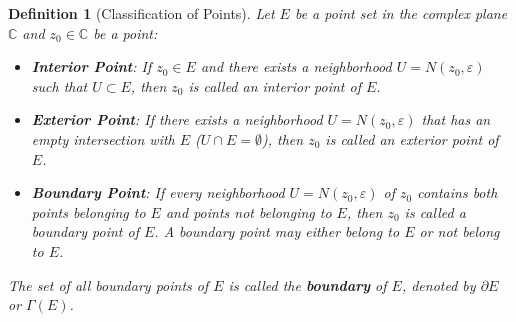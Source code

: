 \documentclass[11pt,a4paper]{article}
\theoremstyle{definitionbreak}
\newtheorem{definition}{Definition}
\theoremstyle{examplebreak}
\theoremstyle{plain}
\begin{document}
\begin{definition}[Classification of Points]
Let $E$ be a point set in the complex plane $\mathbb{C}$ and $z_0 \in \mathbb{C}$ be a point:
\begin{itemize}
    \item \textbf{Interior Point}: If $z_0 \in E$ and there exists a neighborhood $U = N(z_0, \varepsilon)$ such that $U \subset E$, then $z_0$ is called an interior point of $E$.
    \item \textbf{Exterior Point}: If there exists a neighborhood $U = N(z_0, \varepsilon)$ that has an empty intersection with $E$ ($U \cap E = \emptyset$), then $z_0$ is called an exterior point of $E$.
    \item \textbf{Boundary Point}: If every neighborhood $U = N(z_0, \varepsilon)$ of $z_0$ contains both points belonging to $E$ and points not belonging to $E$, then $z_0$ is called a boundary point of $E$. A boundary point may either belong to $E$ or not belong to $E$.
\end{itemize}
The set of all boundary points of $E$ is called the \textbf{boundary} of $E$, denoted by $\partial E$ or $\Gamma(E)$.
\end{definition}
\end{document}

